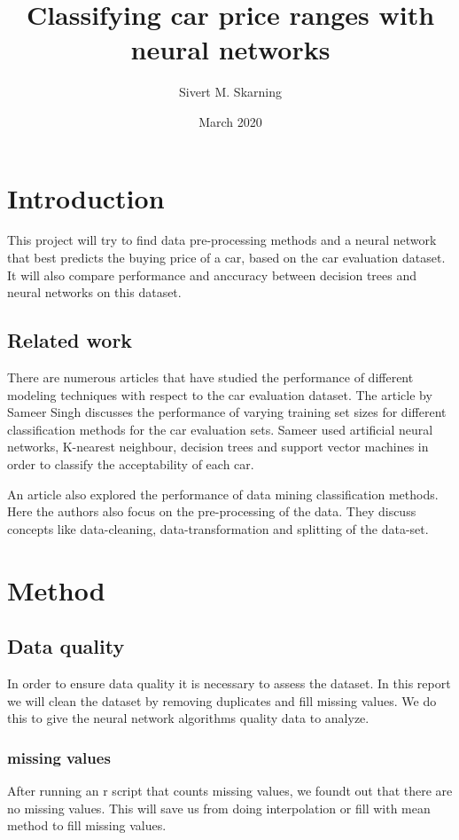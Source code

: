 \documentclass[a4paper, 12pt]{article}
\title{Classifying car price ranges with neural networks}
\author{Sivert M. Skarning}
\date{March 2020}
\begin{document}
\maketitle
\clearpage
\tableofcontents
\clearpage

\section{Introduction}
This project will try to find data pre-processing methods and a neural network that best predicts the buying price of a car, based on the car evaluation dataset.
It will also compare performance and anccuracy between decision trees and neural networks on this dataset.
\subsection{Related work}
There are numerous articles that have studied the performance of different modeling techniques with respect to the car evaluation dataset. The article by Sameer Singh\cite{singh2005modeling} discusses the performance of varying training set sizes for different classification methods for the car evaluation sets. Sameer used artificial neural networks, K-nearest neighbour, decision trees and support vector machines in order to classify the acceptability of each car.


An article\cite{perf} also explored the performance of data mining classification methods. Here the authors also focus on the pre-processing of the data. They discuss concepts like data-cleaning, data-transformation and splitting of the data-set.

\section{Method}

\subsection{Data quality}
In order to ensure data quality it is necessary to assess the dataset. In this report we will clean the dataset by removing duplicates and fill missing values. We do this to give the neural network algorithms quality data to analyze\cite{quality}.
\subsubsection{missing values}
After running an r script that counts missing values, we foundt out that there are no missing values. This will save us from doing interpolation or fill with mean method to fill missing values.
\end{document}
